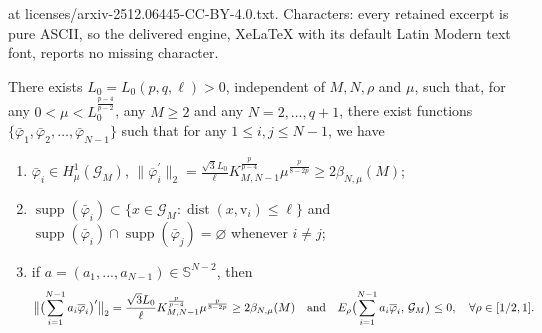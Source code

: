 \documentclass[10pt,a4paper]{amsart}
\newcommand{\G}{\mathcal{G}}
\newcommand{\vv}{\mathrm{v}}
\begin{document}
at licenses/arxiv-2512.06445-CC-BY-4.0.txt. Characters: every retained excerpt is pure ASCII, so the delivered engine, XeLaTeX with its default Latin Modern text font, reports no missing character.
\begin{lemma}\label{lem controlled upper endpoint}
There exists $L_0=L_0(p,q,\ell)>0$, independent of $M,N,\rho$ and $\mu$, such that, for any $0<\mu<L_0^\frac{p-4}{p-2}$, any $M\geq 2$ and any $N=2,\ldots,q+1$, 
 there exist functions \(\{\bar{\varphi}_{1},\bar{\varphi}_{2},\ldots,\bar{\varphi}_{N-1}\}\) such that for any \(1\leq i,j\leq N-1\), we have
\begin{enumerate}[label=(\roman*)]
		\item\(\bar{\varphi}_{i}\in H^1_\mu(\G_M)\), \( \|\overline{\varphi}^{\prime}_{i}\|_2 =\frac{\sqrt{3}L_{0}}{\ell}
K^{\frac{p}{p-4}}_{M,N-1}
\mu^\frac{p}{8-2p} \geq 2\beta_{N,\mu}(M) \);\label{lem7.51}
		\item $\operatorname{supp}(\bar{\varphi}_{i}) \subset \{x\in \G_M:\operatorname{dist}(x,\vv_i)\leq\ell\}$ and \(\operatorname{supp}(\bar{\varphi}_{i})\cap\operatorname{supp}(\bar{\varphi}_{j})=\varnothing\) whenever \(i\neq j\);\label{lem7.52}
		\item  if \(a=(a_1,...,a_{N-1})\in\mathbb{S}^{N-2}\),  then $$\bigl{\|}\bigl{(}\sum_{i=1}^{N-1}a_{i}\overline{\varphi}_{i}\bigr{)}^{\prime}\bigr{\|}_2=\frac{\sqrt{3}L_0}{\ell}
K^{\frac{p}{p-4}}_{M,N-1}
\mu^\frac{p}{8-2p} \geq 2\beta_{N,\mu}(M) \quad  \text{and}\quad E_{\rho}\bigl{(}\sum_{i=1}^{N-1}a_{i}\overline{\varphi}_{i},\,\mathcal{G}_{M}\bigr{)} \leq 0, \quad \forall \rho \in[1/2,1].$$\label{lem7.53}
\end{enumerate}
\end{lemma}
\end{document}
